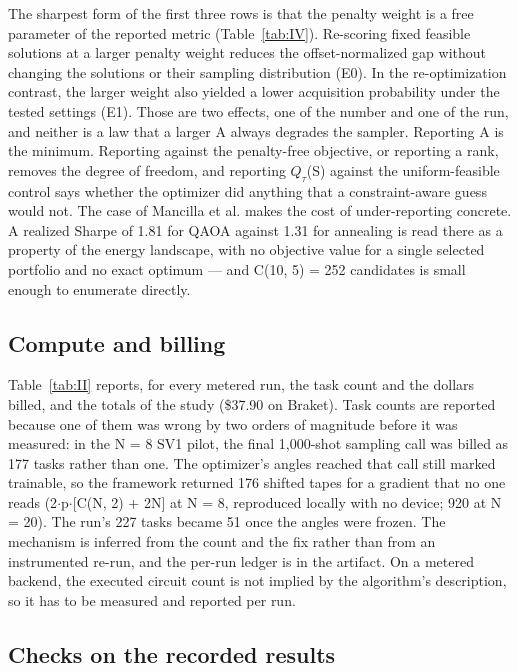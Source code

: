 \documentclass{ieeeaccess}
\begin{document}
The sharpest form of the first three rows is that the penalty weight is a free parameter of the reported metric (Table~\ref{tab:IV}). Re-scoring fixed feasible solutions at a larger penalty weight reduces the offset-normalized gap without changing the solutions or their sampling distribution (E0). In the re-optimization contrast, the larger weight also yielded a lower acquisition probability under the tested settings (E1). Those are two effects, one of the number and one of the run, and neither is a law that a larger A always degrades the sampler. Reporting A is the minimum. Reporting against the penalty-free objective, or reporting a rank, removes the degree of freedom, and reporting $Q_{\tau}$(S) against the uniform-feasible control says whether the optimizer did anything that a constraint-aware guess would not. The case of Mancilla et al. \cite{ref27} makes the cost of under-reporting concrete. A realized Sharpe of 1.81 for QAOA against 1.31 for annealing is read there as a property of the energy landscape, with no objective value for a single selected portfolio and no exact optimum --- and C(10, 5) = 252 candidates is small enough to enumerate directly.


\subsection{Compute and billing}


Table~\ref{tab:II} reports, for every metered run, the task count and the dollars billed, and the totals of the study (\$37.90 on Braket). Task counts are reported because one of them was wrong by two orders of magnitude before it was measured: in the N = 8 SV1 pilot, the final 1,000-shot sampling call was billed as 177 tasks rather than one. The optimizer's angles reached that call still marked trainable, so the framework returned 176 shifted tapes for a gradient that no one reads (2$\cdot$p$\cdot$[C(N, 2) + 2N] at N = 8, reproduced locally with no device; 920 at N = 20). The run's 227 tasks became 51 once the angles were frozen. The mechanism is inferred from the count and the fix rather than from an instrumented re-run, and the per-run ledger is in the artifact. On a metered backend, the executed circuit count is not implied by the algorithm's description, so it has to be measured and reported per run.


\subsection{Checks on the recorded results}
\end{document}
